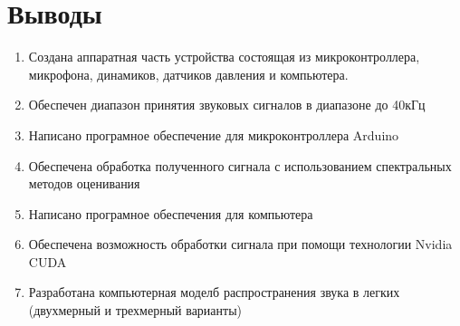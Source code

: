 \documentclass[../main.tex]{subfiles}
\begin{document}
\section*{Выводы}
%

\begin{enumerate}
  \item Создана аппаратная часть устройства состоящая из микроконтроллера, микрофона, динамиков, датчиков давления и компьютера.
  \item Обеспечен диапазон принятия звуковых сигналов в диапазоне до 40кГц
  \item Написано програмное обеспечение для микроконтроллера Arduino
  \item Обеспечена обработка полученного сигнала с использованием спектральных методов оценивания
  \item Написано програмное обеспечения для компьютера
  \item Обеспечена возможность обработки сигнала при помощи технологии Nvidia CUDA
  \item Разработана компьютерная моделб распространения звука в легких (двухмерный и трехмерный варианты)
\end{enumerate}
\newpage
\end{document}
